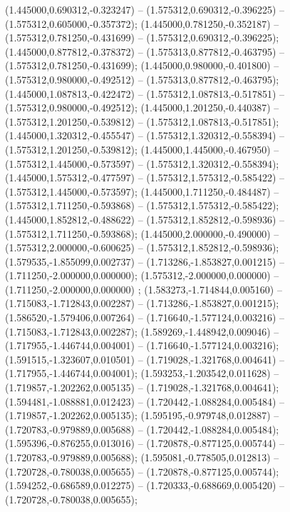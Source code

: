  (1.445000,0.690312,-0.323247) -- (1.575312,0.690312,-0.396225) -- (1.575312,0.605000,-0.357372);
 (1.445000,0.781250,-0.352187) -- (1.575312,0.781250,-0.431699) -- (1.575312,0.690312,-0.396225);
 (1.445000,0.877812,-0.378372) -- (1.575313,0.877812,-0.463795) -- (1.575312,0.781250,-0.431699);
 (1.445000,0.980000,-0.401800) -- (1.575312,0.980000,-0.492512) -- (1.575313,0.877812,-0.463795);
 (1.445000,1.087813,-0.422472) -- (1.575312,1.087813,-0.517851) -- (1.575312,0.980000,-0.492512);
 (1.445000,1.201250,-0.440387) -- (1.575312,1.201250,-0.539812) -- (1.575312,1.087813,-0.517851);
 (1.445000,1.320312,-0.455547) -- (1.575312,1.320312,-0.558394) -- (1.575312,1.201250,-0.539812);
 (1.445000,1.445000,-0.467950) -- (1.575312,1.445000,-0.573597) -- (1.575312,1.320312,-0.558394);
 (1.445000,1.575312,-0.477597) -- (1.575312,1.575312,-0.585422) -- (1.575312,1.445000,-0.573597);
 (1.445000,1.711250,-0.484487) -- (1.575312,1.711250,-0.593868) -- (1.575312,1.575312,-0.585422);
 (1.445000,1.852812,-0.488622) -- (1.575312,1.852812,-0.598936) -- (1.575312,1.711250,-0.593868);
 (1.445000,2.000000,-0.490000) -- (1.575312,2.000000,-0.600625) -- (1.575312,1.852812,-0.598936);
 (1.579535,-1.855099,0.002737) -- (1.713286,-1.853827,0.001215) -- (1.711250,-2.000000,0.000000);
 (1.575312,-2.000000,0.000000) -- (1.711250,-2.000000,0.000000) ;
 (1.583273,-1.714844,0.005160) -- (1.715083,-1.712843,0.002287) -- (1.713286,-1.853827,0.001215);
 (1.586520,-1.579406,0.007264) -- (1.716640,-1.577124,0.003216) -- (1.715083,-1.712843,0.002287);
 (1.589269,-1.448942,0.009046) -- (1.717955,-1.446744,0.004001) -- (1.716640,-1.577124,0.003216);
 (1.591515,-1.323607,0.010501) -- (1.719028,-1.321768,0.004641) -- (1.717955,-1.446744,0.004001);
 (1.593253,-1.203542,0.011628) -- (1.719857,-1.202262,0.005135) -- (1.719028,-1.321768,0.004641);
 (1.594481,-1.088881,0.012423) -- (1.720442,-1.088284,0.005484) -- (1.719857,-1.202262,0.005135);
 (1.595195,-0.979748,0.012887) -- (1.720783,-0.979889,0.005688) -- (1.720442,-1.088284,0.005484);
 (1.595396,-0.876255,0.013016) -- (1.720878,-0.877125,0.005744) -- (1.720783,-0.979889,0.005688);
 (1.595081,-0.778505,0.012813) -- (1.720728,-0.780038,0.005655) -- (1.720878,-0.877125,0.005744);
 (1.594252,-0.686589,0.012275) -- (1.720333,-0.688669,0.005420) -- (1.720728,-0.780038,0.005655);
